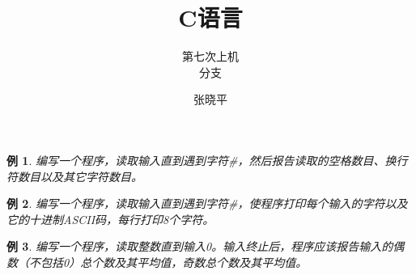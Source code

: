 \documentclass[12pt,notheorems]{beamer}
\newtheorem{li}{例}
\begin{document}
\title{C语言}
\subtitle{第七次上机\\ 分支}
\author{张晓平}


\begin{frame}[plain]\transboxout
\titlepage
\end{frame}



%
\begin{frame}[fragile]
\begin{li}
编写一个程序，读取输入直到遇到字符\#，然后报告读取的空格数目、换行符数目以及其它字符数目。
\end{li}
\end{frame}

\begin{frame}

\end{frame}

\begin{frame}[fragile]
\begin{li}
编写一个程序，读取输入直到遇到字符\#，使程序打印每个输入的字符以及它的十进制ASCII码，每行打印8个字符。
\end{li}
\end{frame}

\begin{frame}

\end{frame}

\begin{frame}[fragile]
\begin{li}
编写一个程序，读取整数直到输入0。输入终止后，程序应该报告输入的偶数（不包括0）总个数及其平均值，奇数总个数及其平均值。
\end{li}
\end{frame}
\end{document}
